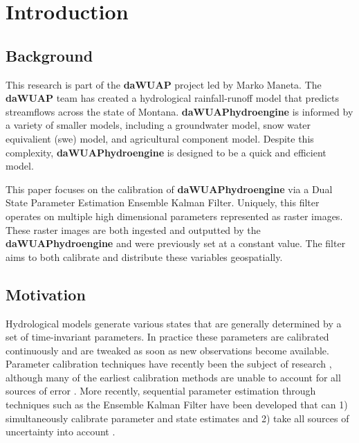 \chapter{Introduction}

\section{Background}

This research is part of the \textbf{daWUAP} project led by Marko Maneta. The \textbf{daWUAP} team has created a hydrological rainfall-runoff model that predicts streamflows across the state of Montana. \textbf{daWUAPhydroengine} is informed by a variety of smaller models, including a groundwater model, snow water equivalient (swe) model, and agricultural component model. Despite this complexity, \textbf{daWUAPhydroengine} is designed to be a quick and efficient model.

This paper focuses on the calibration of \textbf{daWUAPhydroengine} via a Dual State Parameter Estimation Ensemble Kalman Filter. Uniquely, this filter operates on multiple high dimensional parameters represented as raster images. These raster images are both ingested and outputted by the \textbf{daWUAPhydroengine} and were previously set at a constant value. The filter aims to both calibrate and distribute these variables geospatially. 

\section{Motivation}
\label{ch1:opts}

Hydrological models generate various states that are generally determined by a set of time-invariant parameters. In practice these parameters are calibrated continuously and are tweaked as soon as new observations become available. Parameter calibration techniques have recently been the subject of research \cite{Xie2010} \cite{Sorooshian1993}, although many of the earliest calibration methods are unable to account for all sources of error \cite{Evensen1994}. More recently, sequential parameter estimation through techniques such as the Ensemble Kalman Filter have been developed that can 1) simultaneously calibrate parameter and state estimates and 2) take all sources of uncertainty into account \cite{Evensen2003}.

